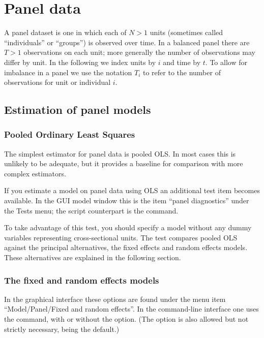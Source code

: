 \chapter{Panel data}
\label{chap:panel}

A panel dataset is one in which each of $N>1$ units (sometimes called
``individuals'' or ``groups'') is observed over time. In a balanced
panel there are $T>1$ observations on each unit; more generally the
number of observations may differ by unit. In the following we index
units by $i$ and time by $t$. To allow for imbalance in a panel we use
the notation $T_i$ to refer to the number of observations for unit
or individual $i$.

\section{Estimation of panel models}

\subsection{Pooled Ordinary Least Squares}
\label{pooled-est}

The simplest estimator for panel data is pooled OLS.  In most cases
this is unlikely to be adequate, but it provides a baseline for
comparison with more complex estimators.

If you estimate a model on panel data using OLS an additional test
item becomes available.  In the GUI model window this is the item
``panel diagnostics'' under the \textsf{Tests} menu; the script
counterpart is the  command.

To take advantage of this test, you should specify a model without any
dummy variables representing cross-sectional units.  The test compares
pooled OLS against the principal alternatives, the fixed effects and
random effects models.  These alternatives are explained in the
following section.

\subsection{The fixed and random effects models}
\label{sec:FE-vs-RE}

In the graphical interface these options are found under the menu item
``Model/Panel/Fixed and random effects''.  In the command-line
interface one uses the  command, with or without the
 option. (The  option is 
also allowed but not strictly necessary, being the default.)

